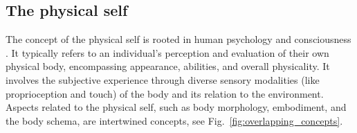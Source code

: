 \subsection{The physical self}
%
%
The concept of the physical self is rooted in human psychology and consciousness \cite{Tsakiris2016multisensorybasisself,Overgaard2023selfitsbody}. It typically refers to an individual's perception and evaluation of their own physical body, encompassing appearance, abilities, and overall physicality. It involves the subjective experience through diverse sensory modalities (like proprioception and touch) of the body and its relation to the environment. Aspects related to the physical self, such as body morphology, embodiment, and the body schema, are intertwined concepts, see Fig.~\ref{fig:overlapping_concepts}.

